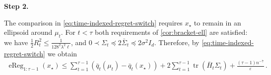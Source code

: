 \documentclass{article}
\newcommand{\proofstepinline}[1]{%
    {\normalfont\normalsize\bfseries\color{blue!55!black}Step #1.}\enspace
}
\newcommand{\tr}{\operatorname{tr}}
\newcommand{\1}{\mathbf 1}
\newcommand{\eps}{\varepsilon}
\begin{document}
\proofstepinline{2}
The comparison in
\eqref{eq:time-indexed-regret-switch} requires $x_\star$ to remain
in an ellipsoid around $\mu_t$.
For $t < \tau$ both requirements of \cref{cor:bracket-ell} are satisfied:
we have $\frac12R_t^2 \leq \frac{1}{128^2\lambda^2\ell}$, and
$0 \prec \Sigma_t \preceq 2\bar{\Sigma}_t \preceq 2\sigma^2 I_d$.
Therefore, by \cref{eq:time-indexed-regret-switch} we obtain
\begin{align}
    \operatorname{eReg}_{1:\tau -1}(x_{\star})
    \leq
    \sum_{t=1}^{\tau -1}
    \left(\bar{q}_t(\mu_t)-\bar{q}_t(x_{\star})\right)
    +
    2\sum_{t=1}^{\tau -1}
    \tr(\bar{H}_t\Sigma_t)
    +\frac{(\tau -1) n^{-7}}{\eps}\,.
    \label{eq:regret-switch-focus}
\end{align}
\end{document}
